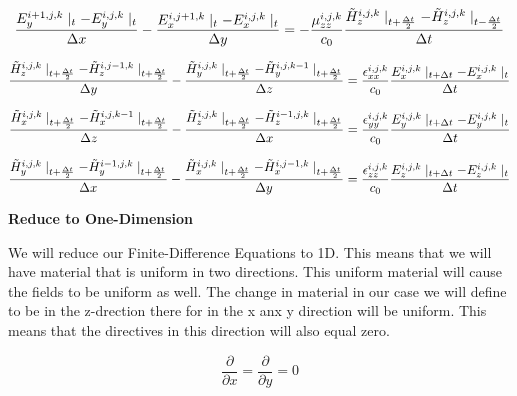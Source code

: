 \documentclass[a4paper,10pt]{article}
\begin{document}
\begin{equation*}
  \frac{E_{y}^{i+1,j,k}\mid_{t} - E_{y}^{i,j,k}\mid_{t}}{\Delta x} - \frac{E_{x}^{i,j+1,k}\mid_{t} - E_{x}^{i,j,k}\mid_{t}}{\Delta y} = -\frac{\mu_{zz}^{i,j,k}}{c_0} \frac{\tilde{H}_{z}^{i,j,k}\mid_{t+\frac  {\Delta t}{2}} - \tilde{H}_{z}^{i,j,k}\mid_{t-\frac{\Delta t}{2}}}{\Delta t}\notag
\end{equation*}

\begin{equation*}
  \frac{\tilde{H}_{z}^{i,j,k}\mid_{t+\frac{\Delta t}{2}} - \tilde{H}_{z}^{i,j-1,k}\mid_{t+\frac  {\Delta t}{2}}}{\Delta y} - \frac{\tilde{H}_{y}^{i,j,k}\mid_{t+\frac  {\Delta t}{2}} - \tilde{H}_{y}^{i,j,k-1}\mid_{t+\frac  {\Delta t}{2}}}{\Delta z} = \frac{\epsilon_{xx}^{i,j,k}}{c_0} \frac{E_{x}^{i,j,k}\mid_{t+\Delta t} - E_{x}^{i,j,k}\mid_{t}}{\Delta t}\notag
\end{equation*}

\begin{equation*}
  \frac{\tilde{H}_{x}^{i,j,k}\mid_{t+\frac{\Delta t}{2}} - \tilde{H}_{x}^{i,j,k-1}\mid_{t+\frac  {\Delta t}{2}}}{\Delta z} - \frac{\tilde{H}_{z}^{i,j,k}\mid_{t+\frac  {\Delta t}{2}} - \tilde{H}_{z}^{i-1,j,k}\mid_{t+\frac  {\Delta t}{2}}}{\Delta x} = \frac{\epsilon_{yy}^{i,j,k}}{c_0} \frac{E_{y}^{i,j,k}\mid_{t+\Delta t} - E_{y}^{i,j,k}\mid_{t}}{\Delta t}\notag
\end{equation*}

\begin{equation*}
  \frac{\tilde{H}_{y}^{i,j,k}\mid_{t+\frac{\Delta t}{2}} - \tilde{H}_{y}^{i-1,j,k}\mid_{t+\frac  {\Delta t}{2}}}{\Delta x} - \frac{\tilde{H}_{x}^{i,j,k}\mid_{t+\frac  {\Delta t}{2}} - \tilde{H}_{x}^{i,j-1,k}\mid_{t+\frac  {\Delta t}{2}}}{\Delta y} = \frac{\epsilon_{zz}^{i,j,k}}{c_0} \frac{E_{z}^{i,j,k}\mid_{t+\Delta t} - E_{z}^{i,j,k}\mid_{t}}{\Delta t}\notag
\end{equation*}



\textbf{Reduce to One-Dimension}

We will reduce our Finite-Difference Equations to 1D.  This means that we will have material that is uniform in two directions.  
This uniform material will cause the fields to be uniform as well.  The change in material in our case we will define to be in the z-drection there for in the x anx y direction
will be uniform.  This means that the directives in this direction will also equal zero.

\begin{equation*}
 \frac{\partial}{\partial x} = \frac{\partial}{\partial y}=0
\end{equation*}
\end{document}
